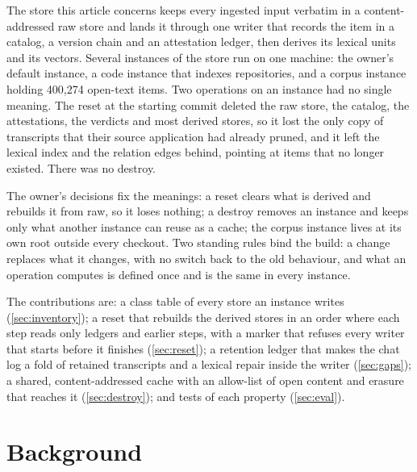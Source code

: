\documentclass[11pt]{article}
\theoremstyle{plain}
\theoremstyle{definition}
\theoremstyle{remark}
\newcommand{\corpusitems}{400{,}274}
\begin{document}
The store this article concerns keeps every ingested input verbatim in a content-addressed raw
store and lands it through one writer that records the item in a catalog, a version chain and an
attestation ledger, then derives its lexical units and its vectors. Several instances of the store
run on one machine: the owner's default instance, a code instance that indexes repositories, and a
corpus instance holding \corpusitems{} open-text items. Two operations on an instance had no single
meaning. The reset at the starting commit deleted the raw store, the catalog, the attestations, the
verdicts and most derived stores, so it lost the only copy of transcripts that their source
application had already pruned, and it left the lexical index and the relation edges behind,
pointing at items that no longer existed. There was no destroy.

The owner's decisions fix the meanings: a reset clears what is derived and rebuilds it from raw, so
it loses nothing; a destroy removes an instance and keeps only what another instance can reuse as a
cache; the corpus instance lives at its own root outside every checkout. Two standing rules bind the
build: a change replaces what it changes, with no switch back to the old behaviour, and what an
operation computes is defined once and is the same in every instance.

The contributions are: a class table of every store an instance writes (\cref{sec:inventory}); a
reset that rebuilds the derived stores in an order where each step reads only ledgers and earlier
steps, with a marker that refuses every writer that starts before it finishes (\cref{sec:reset}); a retention
ledger that makes the chat log a fold of retained transcripts and a lexical repair inside the
writer (\cref{sec:gaps}); a shared, content-addressed cache with an allow-list of open content and
erasure that reaches it (\cref{sec:destroy}); and tests of each property (\cref{sec:eval}).

\section{Background}
\end{document}
